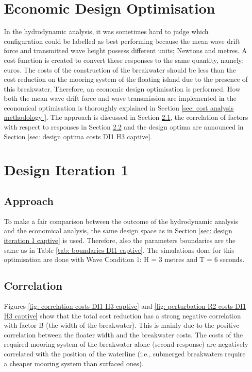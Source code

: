 


\section{Economic Design Optimisation}
\label{ch: economical design optimisation }

In the hydrodynamic analysis, it was sometimes hard to judge which configuration could be labelled as best performing because the mean wave drift force and transmitted wave height possess different units; Newtons and metres. A cost function is created to convert these responses to the same quantity, namely: euros. The costs of the construction of the breakwater should be less than the cost reduction on the mooring system of the floating island due to the presence of this breakwater. Therefore, an economic design optimisation is performed. How both the mean wave drift force and wave transmission are implemented in the economical optimisation is thoroughly explained in Section \ref{sec: cost analysis methodology }. The approach is discussed in Section \ref{sec: approach costs DI1 H3 captive}, the correlation of factors with respect to responses in Section \ref{sec: correlation costs DI1 H3 captive} and the design optima are announced in Section \ref{sec: design optima costs DI1 H3 captive}.

\section{{Design Iteration 1}}

\subsection{Approach}
\label{sec: approach costs DI1 H3 captive}

To make a fair comparison between the outcome of the hydrodynamic analysis and the economical analysis, the same design space as in Section \ref{sec: design iteration 1 captive} is used. Therefore, also the parameters boundaries are the same as in Table \ref{tab: boundaries DI1 captive}. The simulations done for this optimisation are done with Wave Condition 1: H = 3 metres and T = 6 seconds. 


\subsection{Correlation}
\label{sec: correlation costs DI1 H3 captive}

Figures \ref{fig: correlation costs DI1 H3 captive} and \ref{fig: perturbation R2 costs DI1 H3 captive} show that the total cost reduction has a strong negative correlation with factor B (the width of the breakwater). This is mainly due to the positive correlation between the floater width and the breakwater costs. The costs of the required mooring system of the breakwater alone (second response) are negatively correlated with the position of the waterline (i.e., submerged breakwaters require a cheaper mooring system than surfaced ones). 

